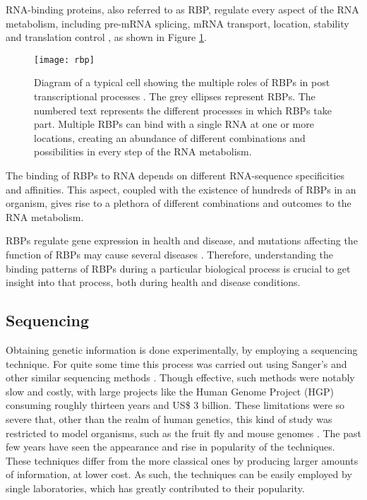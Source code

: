 RNA-binding proteins, also referred to as RBP, regulate every aspect of the RNA
metabolism, including pre-mRNA splicing, mRNA transport, location, stability and
translation control \cite{Cooper2009777, Muller-McNicoll2013, Sonenberg2007721,
Sonenberg2009731}, as shown in Figure \ref{fig:rbp}.

\begin{figure}[!htb]
  \begin{center}
    \leavevmode
    \texttt{[image: rbp]}
    \caption[Role of RBPs in the RNA metabolism process]{
      Diagram of a typical cell showing the multiple roles of RBPs in post
      transcriptional processes \cite{janga2011construction}. The grey ellipses
      represent RBPs. The numbered text represents the different processes in
      which RBPs take part. Multiple RBPs can bind with a single RNA at one or
      more locations, creating an abundance of different combinations and
      possibilities in every step of the RNA metabolism.
    }
    \label{fig:rbp}
  \end{center}
\end{figure}

The binding of RBPs to RNA depends on different RNA-sequence specificities and
affinities. This aspect, coupled with the existence of hundreds of RBPs in an
organism, gives rise to a plethora of different combinations and outcomes to the
RNA metabolism.

RBPs regulate gene expression in health and disease, and mutations affecting the
function of RBPs may cause several diseases \cite{Cooper2009777}. Therefore,
understanding the binding patterns of RBPs during a particular biological
process is crucial to get insight into that process, both during health and
disease conditions.

\subsection{Sequencing}

Obtaining genetic information is done experimentally, by employing a sequencing
technique. For quite some time this process was carried out using Sanger's and
other similar sequencing methods \cite{Reis-Filho2009}. Though effective, such
methods were notably slow and costly, with large projects like the Human Genome
Project (HGP) consuming roughly thirteen years and US\$ 3 billion. These
limitations were so severe that, other than the realm of human genetics, this
kind of study was restricted to model organisms, such as the fruit fly and mouse
genomes \cite{Wolf2013}. The past few years have seen the appearance and rise in
popularity of the \ngs{} techniques. These techniques differ from the more
classical ones by producing larger amounts of information, at lower cost. As
such, the techniques can be easily employed by single laboratories, which has
greatly contributed to their popularity.


